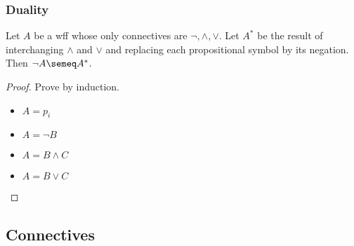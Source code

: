 \documentclass[UTF8,11pt,colorlinks,compress,openany]{beamer}%
\begin{document}
\begin{frame}\frametitle{Duality}
	\begin{theorem}
		Let $A$ be a wff whose only connectives are $\neg,\wedge,\vee$. Let $A^*$ be the result of interchanging $\wedge$ and $\vee$ and replacing each propositional symbol by its negation. Then $\neg A\semeq A^*$.
	\end{theorem}
	\begin{proof}
		Prove by induction.
		\begin{itemize}
			\item $A=p_i$
			\item $A=\neg B$
			\item $A=B\wedge C$
			\item $A=B\vee C$
		\end{itemize}
	\end{proof}
\end{frame}

\subsection{Connectives}
\end{document}
